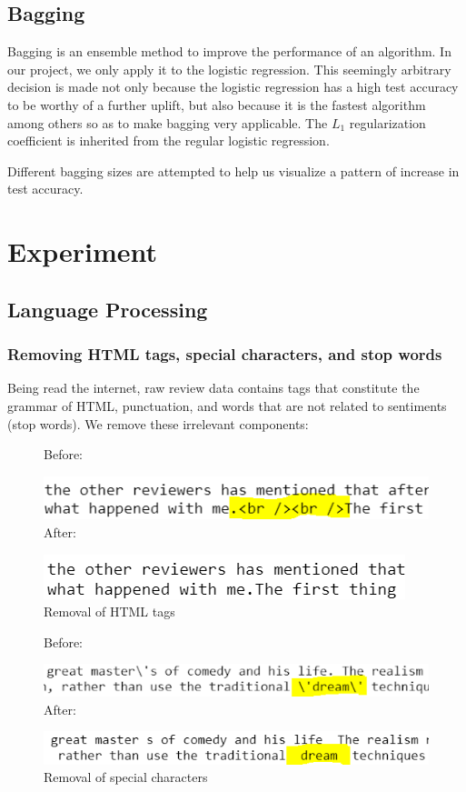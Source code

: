 \documentclass[10pt,twocolumn,letterpage]{article}
\begin{document}
	\subsection{Bagging}
	Bagging is an ensemble method to improve the performance of an algorithm. In our project, we only apply it to the logistic regression. This seemingly arbitrary decision is made not only because the logistic regression has a high test accuracy to be worthy of a further uplift, but also because it is the fastest algorithm among others so as to make bagging very applicable. The $L_1$ regularization coefficient is inherited from the regular logistic regression. 
	
	Different bagging sizes are attempted to help us visualize a pattern of increase in test accuracy. 
	\section{Experiment}	
	\subsection{Language Processing}
	\subsubsection{Removing HTML tags, special characters, and stop words}
	Being read the internet, raw review data contains tags that constitute the grammar of HTML, punctuation, and words that are not related to sentiments (stop words). We remove these irrelevant components: 
	
	\begin{figure}[H]
		\textsf{Before:}
		
		\includegraphics[width = \columnwidth]{html_tag}
		\textsf{After:}
		
		\includegraphics[width = \columnwidth]{html_tag_removed}
		\caption{Removal of HTML tags}
	\end{figure}
	
	\begin{figure}[H]
		\textsf{Before:}
		
		\includegraphics[width = \columnwidth]{special_char}
		\textsf{After:}
		
		\includegraphics[width = \columnwidth]{special_char_removed}
		\caption{Removal of special characters}
	\end{figure}
	
\end{document}
